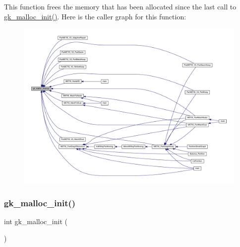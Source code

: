 This function frees the memory that has been allocated since the last call to \hyperlink{a00110_a24633cc1c72a7e92836912c2adcf570a}{gk\+\_\+malloc\+\_\+init()}. Here is the caller graph for this function\+:\nopagebreak
\begin{figure}[H]
\begin{center}
\leavevmode
\includegraphics[width=350pt]{a00077_a47156a22528b5bc8c7c6e9849af34e62_icgraph}
\end{center}
\end{figure}
\mbox{\label{a00077_a24633cc1c72a7e92836912c2adcf570a}} 
\subsubsection{\texorpdfstring{gk\+\_\+malloc\+\_\+init()}{gk\_malloc\_init()}}
{\footnotesize\ttfamily int gk\+\_\+malloc\+\_\+init (\begin{DoxyParamCaption}{ }\end{DoxyParamCaption})}

